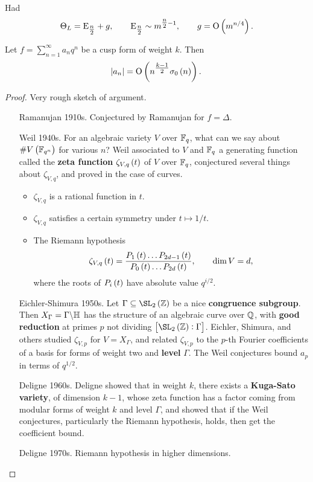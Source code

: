 Had
$$ \Theta_L = \E_{\tfrac{n}{2}} + g, \qquad \E_{\tfrac{n}{2}} \sim m^{\tfrac{n}{2} - 1}, \qquad g = \O\br{m^{n / 4}}. $$

\begin{theorem}[Deligne]
Let $ f = \sum_{n = 1}^\infty a_nq^n $ be a cusp form of weight $ k $. Then
$$ \abs{a_n} = \O\br{n^{\tfrac{k - 1}{2}}\sigma_0\br{n}}. $$
\end{theorem}

\begin{proof}
Very rough sketch of argument.
\begin{itemize}[leftmargin=1in]
\item[Ramanujan 1910s.] Conjectured by Ramanujan for $ f = \Delta $.
\item[Weil 1940s.] For an algebraic variety $ V $ over $ \mathbb{F}_q $, what can we say about $ \#V\br{\FF_{q^n}} $ for various $ n $? Weil associated to $ V $ and $ \mathbb{F}_q $ a generating function called the \textbf{zeta function} $ \zeta_{V, q}\br{t} $ of $ V $ over $ \mathbb{F}_q $, conjectured several things about $ \zeta_{V, q} $, and proved in the case of curves.
\begin{itemize}
\item $ \zeta_{V, q} $ is a rational function in $ t $.
\item $ \zeta_{V, q} $ satisfies a certain symmetry under $ t \mapsto 1 / t $.
\item The Riemann hypothesis
$$ \zeta_{V, q}\br{t} = \dfrac{P_1\br{t} \dots P_{2d - 1}\br{t}}{P_0\br{t} \dots P_{2d}\br{t}}, \qquad \dim V = d, $$
where the roots of $ P_i\br{t} $ have absolute value $ q^{i / 2} $.
\end{itemize}
\item[Eichler-Shimura 1950s.] Let $ \Gamma \subseteq \SL_2\br{\ZZ} $ be a nice \textbf{congruence subgroup}. Then $ X_\Gamma = \Gamma \backslash \mathbb{H} $ has the structure of an algebraic curve over $ \mathbb{Q} $, with \textbf{good reduction} at primes $ p $ not dividing $ \sbr{\SL_2\br{\ZZ} : \Gamma} $. Eichler, Shimura, and others studied $ \zeta_{V, p} $ for $ V = X_\Gamma $, and related $ \zeta_{V, p} $ to the $ p $-th Fourier coefficients of a basis for forms of weight two and \textbf{level} $ \Gamma $. The Weil conjectures bound $ a_p $ in terms of $ q^{1 / 2} $.
\item[Deligne 1960s.] Deligne showed that in weight $ k $, there exists a \textbf{Kuga-Sato variety}, of dimension $ k - 1 $, whose zeta function has a factor coming from modular forms of weight $ k $ and level $ \Gamma $, and showed that if the Weil conjectures, particularly the Riemann hypothesis, holds, then get the coefficient bound.
\item[Deligne 1970s.] Riemann hypothesis in higher dimensions.
\end{itemize}
\end{proof}

